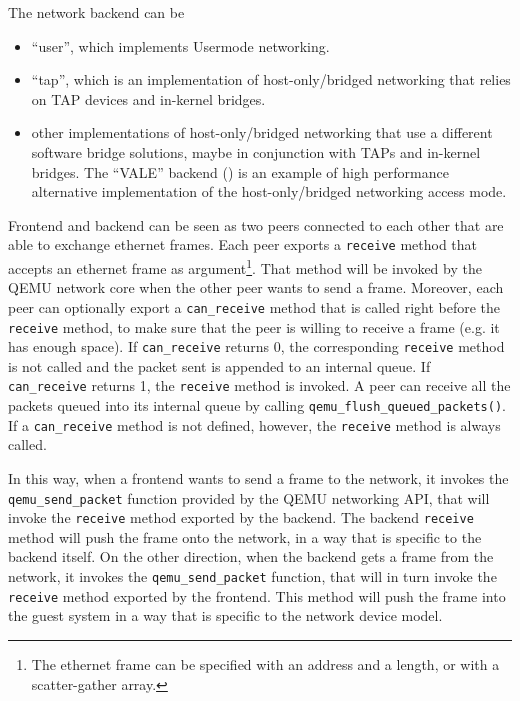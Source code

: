 \vspace{0.5cm}

The network backend can be
\begin{itemize}
    \item ``user'', which implements Usermode networking.
    \item ``tap'', which is an implementation of host-only/bridged networking that relies on TAP devices and in-kernel bridges.
    \item other implementations of host-only/bridged networking that use a different software bridge solutions, maybe in conjunction
	  with TAPs and in-kernel bridges. The ``VALE'' backend (\cite{ref:vale}) is an example of high performance alternative 
	  implementation of the host-only/bridged networking access mode.
\end{itemize}

Frontend and backend can be seen as two peers connected to each other that are able to exchange ethernet frames. Each peer exports a 
\texttt{receive} method that accepts an ethernet frame as argument\footnote{The ethernet frame can be specified with an address 
and a length, or with a scatter-gather array.}. That method will be invoked by the QEMU network core when the other peer wants to 
send a frame. Moreover, each peer can optionally export a \texttt{can\_receive} method that is called right before the \texttt{receive} 
method, to make sure that the peer is willing to receive a frame (e.g. it has enough space). If \texttt{can\_receive} 
returns 0, the corresponding \texttt{receive} method is not called and the packet sent is appended to an internal queue. If 
\texttt{can\_receive} returns 1, the \texttt{receive} method is invoked. A peer can receive all the packets queued into its internal
queue by calling \texttt{qemu\_flush\_queued\_packets()}.
If a \texttt{can\_receive} method is not defined, however, the \texttt{receive} method is always called.


\vspace{0.5cm}

In this way, when a frontend wants to send a frame to the network, it invokes the \texttt{qemu\_send\_packet} function provided by the QEMU
networking API, that will invoke the \texttt{receive} method exported by the backend. The backend \texttt{receive} method will push the
frame onto the network, in a way that is specific to the backend itself.
On the other direction, when the backend gets a frame from the network, it invokes the \texttt{qemu\_send\_packet} function, that will in 
turn invoke the \texttt{receive} method exported by the frontend. This method will push the frame into the guest system in a way that is
specific to the network device model.

